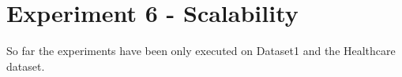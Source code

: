\newpage
\section{Experiment 6 - Scalability}
\label{sec:exp6}
So far the experiments have been only executed on Dataset1 and the Healthcare dataset.